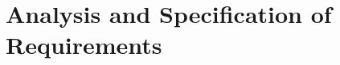 \chapter{Analysis and Specification of Requirements}
\minitoc
\newpage
\setcounter{secnumdepth}{0} %
